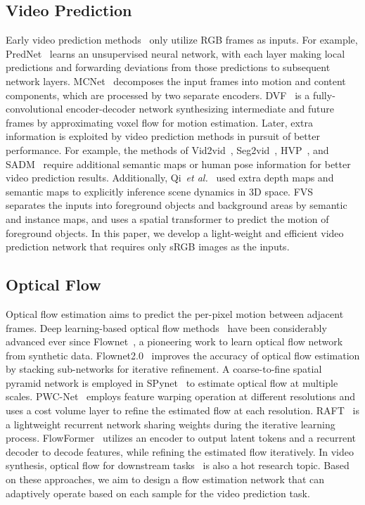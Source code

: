 \documentclass[10pt,twocolumn,letterpaper]{article}
\def\etal{{\em et al.}}
\begin{document}
\subsection{Video Prediction}
Early video prediction methods~\cite{prednet,mcnet,dvf} only utilize RGB frames as inputs. For example, PredNet~\cite{prednet} learns an unsupervised neural network, with each layer making local predictions and forwarding deviations from those predictions to subsequent network layers. MCNet~\cite{mcnet} decomposes the input frames into motion and content components, which are processed by two separate encoders. DVF~\cite{dvf} is a fully-convolutional encoder-decoder network synthesizing intermediate and future frames by approximating voxel flow for motion estimation. Later, extra information is exploited by video prediction methods in pursuit of better performance. For example, the methods of Vid2vid~\cite{vid2vid}, Seg2vid~\cite{seg2vid}, HVP~\cite{hvp}, and SADM~\cite{sadm} require additional semantic maps or human pose information for better video prediction results. Additionally, Qi~\etal~\cite{qi} used extra depth maps and semantic maps to explicitly inference scene dynamics in 3D space. FVS~\cite{fvs} separates the inputs into foreground objects and background areas by semantic and instance maps, and uses a spatial transformer to predict the motion of foreground objects. In this paper, we develop a light-weight and efficient video prediction network that requires only sRGB images as the inputs.

\subsection{Optical Flow}
Optical flow estimation aims to predict the per-pixel motion between adjacent frames. Deep learning-based optical flow methods~\cite{pwcnet,raft,jonschkowski2020matters,luo2021upflow,han2022realflow} have been considerably advanced ever since Flownet~\cite{flownet}, a pioneering work to learn optical flow network from synthetic data. Flownet2.0~\cite{flownet2} improves the accuracy of optical flow estimation by stacking sub-networks for iterative refinement. A coarse-to-fine spatial pyramid network is employed in SPynet~\cite{spynet} to estimate optical flow at multiple scales. PWC-Net~\cite{pwcnet} employs feature warping operation at different resolutions and uses a cost volume layer to refine the estimated flow at each resolution. RAFT~\cite{raft} is a lightweight recurrent network sharing weights during the iterative learning process. FlowFormer~\cite{flowformer} utilizes an encoder to output latent tokens and a recurrent decoder to decode features, while refining the estimated flow iteratively. In video synthesis, optical flow for downstream tasks~\cite{vimeo,dvf,rife,qvi,zhang2023extracting} is also a hot research topic. Based on these approaches, we aim to design a flow estimation network that can adaptively operate based on each sample for the video prediction task.
\end{document}
